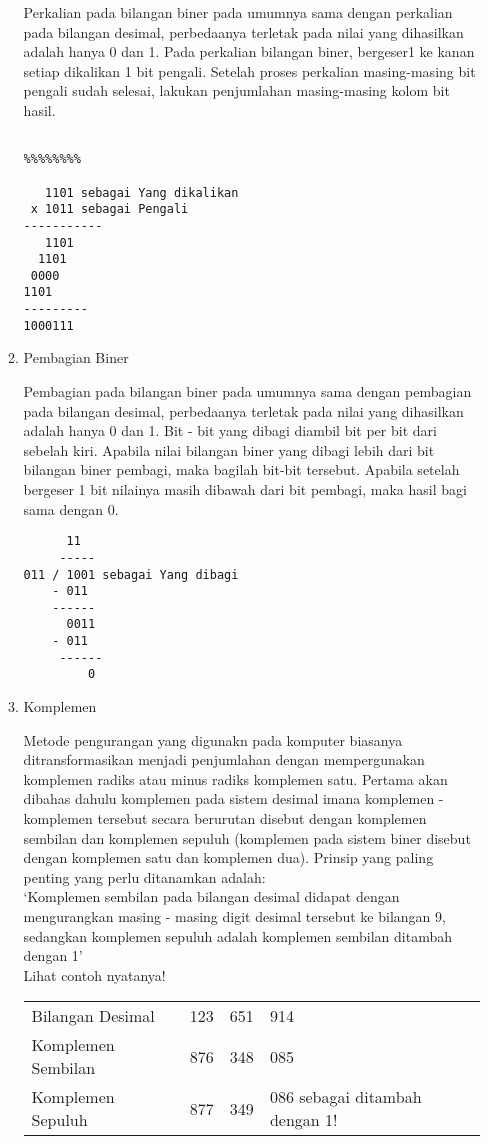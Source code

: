 \begin{enumerate}[label=(\alph*)]
\begin{enumerate}
\qquad Perkalian pada bilangan biner pada umumnya sama dengan perkalian pada bilangan desimal, perbedaanya terletak pada nilai yang dihasilkan adalah hanya 0 dan 1. Pada perkalian bilangan biner, bergeser1 ke kanan setiap dikalikan 1 bit pengali. Setelah proses perkalian masing-masing bit pengali sudah selesai, lakukan penjumlahan masing-masing kolom bit hasil.
\begin{verbatim}

%%%%%%%%

   1101 sebagai Yang dikalikan
 x 1011 sebagai Pengali
-----------
   1101
  1101
 0000
1101
---------
1000111
\end{verbatim}


\item Pembagian Biner

\qquad Pembagian pada bilangan biner pada umumnya sama dengan pembagian pada bilangan desimal, perbedaanya terletak pada nilai yang dihasilkan  adalah hanya 0 dan 1. Bit - bit yang dibagi diambil bit per bit dari sebelah kiri. Apabila nilai bilangan biner yang dibagi lebih dari bit bilangan biner pembagi, maka bagilah bit-bit tersebut. Apabila setelah bergeser 1 bit nilainya masih dibawah dari bit pembagi, maka hasil bagi sama dengan 0.
\begin{verbatim}
      11
     -----
011 / 1001 sebagai Yang dibagi
    - 011
    ------
      0011
    - 011
     ------
         0
\end{verbatim}


\item Komplemen

\qquad Metode pengurangan yang digunakn pada komputer biasanya ditransformasikan menjadi penjumlahan dengan mempergunakan komplemen radiks atau minus radiks komplemen satu. Pertama akan dibahas dahulu komplemen pada sistem desimal imana komplemen - komplemen tersebut secara berurutan disebut dengan komplemen sembilan dan komplemen sepuluh (komplemen pada sistem biner disebut dengan komplemen satu dan komplemen dua). Prinsip yang paling penting yang perlu ditanamkan adalah: \\

\qquad `Komplemen sembilan pada bilangan desimal didapat dengan mengurangkan masing - masing digit desimal tersebut ke bilangan 9, sedangkan komplemen sepuluh adalah komplemen sembilan ditambah dengan 1' \\
Lihat contoh nyatanya!\\

\begin{tabular}{ l l l l }
Bilangan Desimal & 123 & 651 & 914 \\
Komplemen Sembilan &876 &348 &085 \\
Komplemen Sepuluh &877 &349 &086 sebagai ditambah dengan 1! \\
\end{tabular}\\


\end{enumerate}
\end{enumerate}

